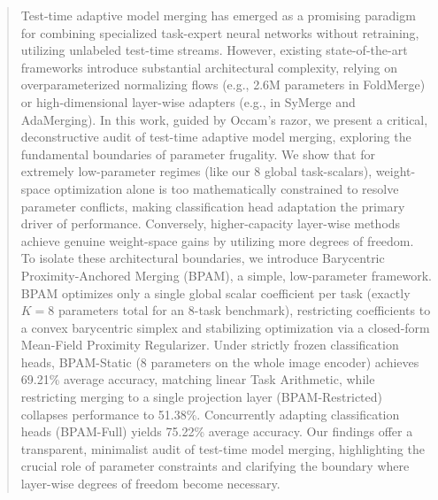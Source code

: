 \begin{abstract}
Test-time adaptive model merging has emerged as a promising paradigm for combining specialized task-expert neural networks without retraining, utilizing unlabeled test-time streams. However, existing state-of-the-art frameworks introduce substantial architectural complexity, relying on overparameterized normalizing flows (e.g., 2.6M parameters in FoldMerge) or high-dimensional layer-wise adapters (e.g., in SyMerge and AdaMerging). In this work, guided by Occam's razor, we present a critical, deconstructive audit of test-time adaptive model merging, exploring the fundamental boundaries of parameter frugality. We show that for extremely low-parameter regimes (like our 8 global task-scalars), weight-space optimization alone is too mathematically constrained to resolve parameter conflicts, making classification head adaptation the primary driver of performance. Conversely, higher-capacity layer-wise methods achieve genuine weight-space gains by utilizing more degrees of freedom. To isolate these architectural boundaries, we introduce Barycentric Proximity-Anchored Merging (BPAM), a simple, low-parameter framework. BPAM optimizes only a single global scalar coefficient per task (exactly $K=8$ parameters total for an 8-task benchmark), restricting coefficients to a convex barycentric simplex and stabilizing optimization via a closed-form Mean-Field Proximity Regularizer. Under strictly frozen classification heads, BPAM-Static (8 parameters on the whole image encoder) achieves 69.21\% average accuracy, matching linear Task Arithmetic, while restricting merging to a single projection layer (BPAM-Restricted) collapses performance to 51.38\%. Concurrently adapting classification heads (BPAM-Full) yields 75.22\% average accuracy. Our findings offer a transparent, minimalist audit of test-time model merging, highlighting the crucial role of parameter constraints and clarifying the boundary where layer-wise degrees of freedom become necessary.
\end{abstract}
